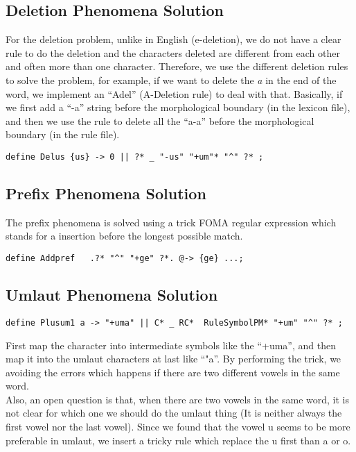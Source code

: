 \documentclass[11pt,letterpaper]{article}
\begin{document}
\subsection{Deletion Phenomena Solution}
For the deletion problem, unlike in English (e-deletion), we do not have a clear rule to do the deletion and the characters deleted are different from each other and often more than one character. Therefore, we use the different deletion rules to solve the problem, for example, if we want to delete the \textit{a} in the end of the word, we implement an ``Adel'' (A-Deletion rule) to deal with that. Basically, if we first add a ``-a'' string before the morphological boundary (in the lexicon file), and then we use the rule to delete all the ``a-a'' before the morphological boundary (in the rule file).
\begin{verbatim}
define Delus {us} -> 0 || ?* _ "-us" "+um"* "^" ?* ;
\end{verbatim}

\subsection{Prefix Phenomena Solution}
The prefix phenomena is solved using a trick FOMA regular expression which stands for a insertion before the longest possible match.
\begin{verbatim}
define Addpref   .?* "^" "+ge" ?*. @-> {ge} ...;
\end{verbatim}

\subsection{Umlaut Phenomena Solution}

\begin{verbatim}
define Plusum1 a -> "+uma" || C* _ RC*  RuleSymbolPM* "+um" "^" ?* ;
\end{verbatim}
First map the character into intermediate symbols like the ``+uma'', and then map it into the umlaut characters at last like ``"a''. By performing the trick, we avoiding the errors which happens if there are two different vowels in the same word.\\
Also, an open question is that, when there are two vowels in the same word, it is not clear for which one we should do the umlaut thing (It is neither always the first vowel nor the last vowel). Since we found that the vowel u seems to be more preferable in umlaut, we insert a tricky rule which replace the u first than a or o.
\end{document}
